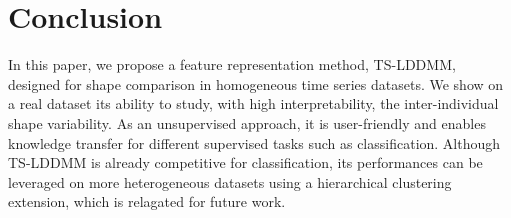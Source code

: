 \begin{table}[t]
  \vspace{-0.5em}
  \caption{Classification results in f1-score (U: unsupervised, S: supervised, DL: deep learning, ML: machine learning). \textbf{x} best unsupervised method, \underline{x} best supervised method.}
\vspace{-2em}
  \end{table}
\section{Conclusion}
In this paper, we propose a feature representation method, TS-LDDMM, designed for 
shape comparison in homogeneous time series datasets. We show on a real dataset 
its ability to study, with high interpretability, the inter-individual shape 
variability. As an unsupervised approach, it is user-friendly and enables knowledge 
transfer for different supervised tasks such as classification. Although TS-LDDMM 
is already competitive for classification, its performances can be leveraged on 
more heterogeneous datasets using a hierarchical clustering extension, which is relagated for future work. 


